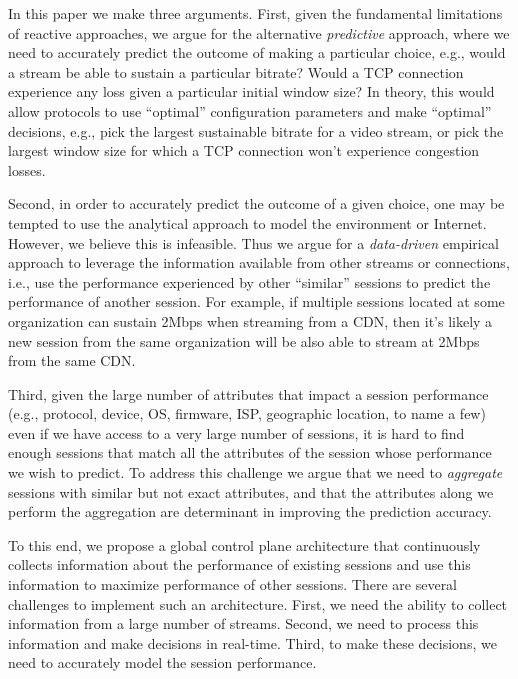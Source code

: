 In this paper we make three arguments. First, given the fundamental limitations of reactive approaches, we argue for the alternative \emph{predictive} approach, where we need to accurately predict the outcome of making a particular choice, e.g., would a stream be able to sustain a particular bitrate? Would a TCP connection experience any loss given a particular initial window size? In theory, this would allow protocols to use ``optimal'' configuration parameters and make ``optimal'' decisions, e.g., pick the largest sustainable bitrate for a video stream,  or pick the largest window size for which a TCP connection won't experience congestion losses.

Second, in order to accurately predict the outcome of a given choice, one may be tempted to use the analytical approach to model the environment or Internet. However, we believe this is infeasible. Thus we argue for a \emph{data-driven} empirical approach to leverage the information available from other streams or connections, i.e., use the performance experienced by other ``similar'' sessions to predict the performance of another session. For example, if multiple sessions located at some organization can sustain 2Mbps when streaming from a CDN, then it's likely a new session from the same organization will be also able to stream at 2Mbps from the same CDN.

Third, given the large number of attributes that impact a session performance (e.g., protocol, device, OS, firmware, ISP, geographic location, to name a few) even if we have access to a very large number of sessions, it is hard to find enough sessions that match all the attributes of the session whose performance we wish to predict. To address this challenge we argue that we need to \emph{aggregate} sessions with similar but not exact attributes, and that the attributes along we perform the aggregation are determinant in improving the prediction accuracy.

To this end, we propose a global control plane architecture that continuously collects information about the performance of existing sessions and use this information to maximize performance of other sessions. There are several challenges to implement such an architecture. First, we need the ability to collect information from a large number of streams. Second, we need to process this information and make decisions in real-time. Third, to make these decisions, we need to accurately model the session performance. 


